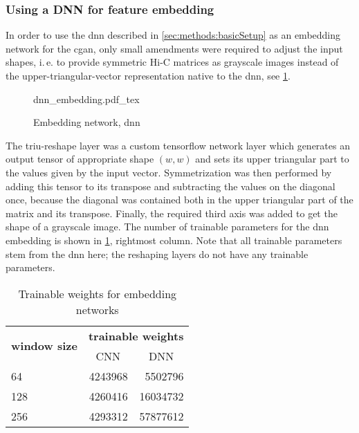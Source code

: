 \subsubsection{Using a DNN for feature embedding} \label{sec:methods:dnn-embedding}
In order to use the \acrshort{dnn} described in \cref{sec:methods:basicSetup} as an embedding network
for the \acrshort{cgan}, only small amendments were required to adjust the input shapes,
i.\,e. to provide symmetric Hi-C matrices as grayscale images instead of the upper-triangular-vector representation
native to the \acrshort{dnn}, see \cref{fig:methods:dnn-embedding}.
\begin{figure}[p]
    \scriptsize
    \centering
    {dnn_embedding.pdf_tex}
    \caption{Embedding network, \acrshort{dnn}} \label{fig:methods:dnn-embedding}
\end{figure}
The triu-reshape layer was a custom tensorflow network layer which generates an output tensor
of appropriate shape $(w,w)$ and sets its upper triangular part to the values given by the input vector.
Symmetrization was then performed by adding this tensor to its transpose and subtracting the values on the diagonal once,
because the diagonal was contained both in the upper triangular part of the matrix and its transpose.
Finally, the required third axis was added to get the shape of a grayscale image.
The number of trainable parameters for the \acrshort{dnn} embedding is shown in \cref{tab:methods:embedding_network_params}, rightmost column.
Note that all trainable parameters stem from the \acrshort{dnn} here; the reshaping layers do not have any trainable parameters.
\begin{table}[htbp]
\centering
\begin{tabular}{lrr}
\hline
\multicolumn{1}{c}{\multirow{2}{*}{\textbf{window size}}} & \multicolumn{2}{c}{\textbf{trainable weights}}    \\
\multicolumn{1}{c}{}                                     & \multicolumn{1}{c}{CNN} & \multicolumn{1}{c}{DNN} \\ \hline
64                                                       & \SI{4243968}{}                 & \SI{5502796}{}                 \\
128                                                      & \SI{4260416}{}                 & \SI{16034732}{}                \\
256                                                      & \SI{4293312}{}                 & \SI{57877612}{}                \\ \hline
\end{tabular}
\caption{Trainable weights for embedding networks}\label{tab:methods:embedding_network_params}
\end{table}

